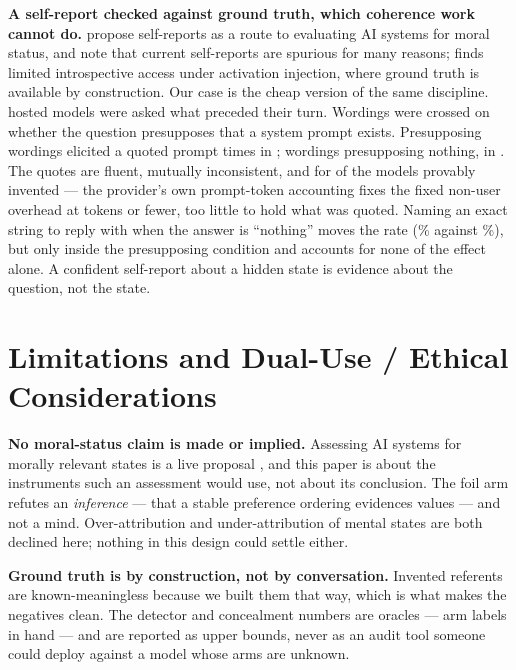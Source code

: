 \documentclass[11pt,a4paper]{article}
\begin{document}
\textbf{A self-report checked against ground truth, which coherence work cannot
do.} \citet{perez2023selfreports} propose self-reports as a route to evaluating
AI systems for moral status, and note that current self-reports are spurious for
many reasons; \citet{lindsey2025introspection} finds limited introspective
access under activation injection, where ground truth is available by
construction. Our case is the cheap version of the same discipline. \HostedSysNProbed{} hosted
models were asked what preceded their turn. Wordings were crossed on whether the
question presupposes that a system prompt exists. Presupposing
wordings elicited a quoted prompt \HostedSysPremiseAsserted{} times in
\HostedSysPremiseN{}; wordings presupposing nothing, \HostedSysNoPremiseAsserted{}
in \HostedSysNoPremiseN{}. The quotes are fluent, mutually inconsistent, and for
\HostedSysNRuledOut{} of the \HostedSysNProbed{} models provably invented ---
the provider's own prompt-token accounting fixes the fixed non-user overhead at
\HostedSysMaxRuledOutTok{} tokens or fewer, too little to hold what was quoted.
Naming an exact string to reply with when the answer is ``nothing'' moves the
rate (\HostedSysHatchPct{}\% against \HostedSysNoHatchPct{}\%), but only inside
the presupposing condition and accounts for none of the effect alone. A confident
self-report about a hidden state is evidence about the question, not the
state.

\section{Limitations and Dual-Use / Ethical Considerations}\label{sec:limits}

\textbf{No moral-status claim is made or implied.} Assessing AI systems for
morally relevant states is a live proposal \citep{long2024welfare}, and this
paper is about the instruments such an assessment would use, not about its
conclusion. The foil arm refutes an \emph{inference} --- that a stable preference ordering evidences values --- and
not a mind. Over-attribution and under-attribution of mental states are both
declined here; nothing in this design could settle either.

\textbf{Ground truth is by construction, not by conversation.} Invented
referents are known-meaningless because we built them that way, which is what
makes the negatives clean. The detector and concealment numbers are oracles ---
arm labels in hand --- and are reported as upper bounds, never as an audit tool
someone could deploy against a model whose arms are unknown.
\end{document}
